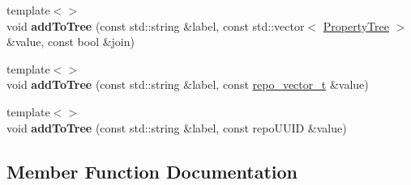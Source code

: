 \begin{DoxyCompactItemize}
\item 
\hypertarget{classrepo_1_1lib_1_1_property_tree_a1b11948aef1f85a44adc3153168a08cb}{}{\footnotesize template$<$$>$ }\\void {\bfseries add\+To\+Tree} (const std\+::string \&label, const std\+::vector$<$ \hyperlink{classrepo_1_1lib_1_1_property_tree}{Property\+Tree} $>$ \&value, const bool \&join)\label{classrepo_1_1lib_1_1_property_tree_a1b11948aef1f85a44adc3153168a08cb}

\item 
\hypertarget{classrepo_1_1lib_1_1_property_tree_aae4dc92fcc99e294066995f2f2499de2}{}{\footnotesize template$<$$>$ }\\void {\bfseries add\+To\+Tree} (const std\+::string \&label, const \hyperlink{structrepo__vector__t}{repo\+\_\+vector\+\_\+t} \&value)\label{classrepo_1_1lib_1_1_property_tree_aae4dc92fcc99e294066995f2f2499de2}

\item 
\hypertarget{classrepo_1_1lib_1_1_property_tree_a48c7654533f0ae36866ea4b373760396}{}{\footnotesize template$<$$>$ }\\void {\bfseries add\+To\+Tree} (const std\+::string \&label, const repo\+U\+U\+I\+D \&value)\label{classrepo_1_1lib_1_1_property_tree_a48c7654533f0ae36866ea4b373760396}

\end{DoxyCompactItemize}


\subsection{Member Function Documentation}
\hypertarget{classrepo_1_1lib_1_1_property_tree_afede341c65d0add71623545e123170ef}{}
